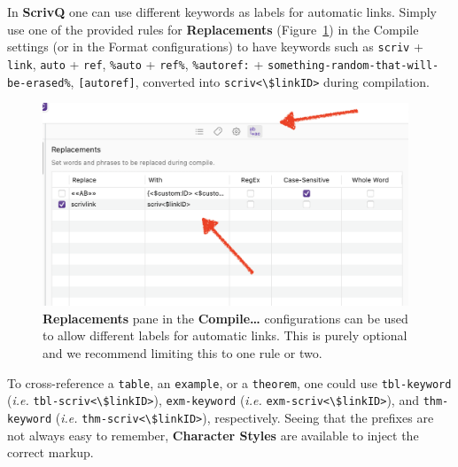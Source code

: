 \documentclass[
  12pt,
  a4paper,
  oneside,
  titlepage,
  toclink=all,
  toc=bibliography]{scrbook}
\theoremstyle{definition}
\theoremstyle{plain}
\theoremstyle{plain}
\theoremstyle{plain}
\theoremstyle{plain}
\theoremstyle{definition}
\theoremstyle{definition}
\theoremstyle{plain}
\theoremstyle{remark}
\begin{document}
\begin{tcolorbox}[enhanced jigsaw, left=2mm, colframe=quarto-callout-tip-color-frame, bottomtitle=1mm, colback=white, coltitle=black, title=\textcolor{quarto-callout-tip-color}{\faLightbulb}\hspace{0.5em}{Choosing your own label for automatic links}, toprule=.15mm, rightrule=.15mm, opacityback=0, breakable, toptitle=1mm, titlerule=0mm, colbacktitle=quarto-callout-tip-color!10!white, arc=.35mm, bottomrule=.15mm, leftrule=.75mm, opacitybacktitle=0.6]

In \textbf{ScrivQ} one can use different keywords as labels for
automatic links. Simply use one of the provided rules for
\textbf{Replacements}
(\protect\hypertarget{cite_6}{}{\label{cite_6}Figure~\ref{fig-scriv3}})
in the Compile settings (or in the Format configurations) to have
keywords such as \texttt{scriv} + \texttt{link}, \texttt{autο} +
\texttt{ref}, \texttt{\%autο} + \texttt{ref\%}, \texttt{\%autοref:} +
\texttt{something-random-that-will-be-erased\%}, \texttt{{[}autοref{]}},
converted into
\texttt{scriv\textless{}\textbackslash{}\$linkID\textgreater{}} during
compilation.

\end{tcolorbox}

\begin{figure}

{\centering \includegraphics[width=4.30208in,height=2.38542in]{Replacements.png}

}

\caption{\label{fig-scriv3}\textbf{Replacements} pane in the
\textbf{Compile\ldots{}} configurations can be used to allow different
labels for automatic links. This is purely optional and we recommend
limiting this to one rule or two.}

\end{figure}

{}To cross-reference a \texttt{table}, an
\texttt{example}, or a \texttt{theorem}, one could use
\texttt{tbl-keyword} (\emph{i.e.}
\texttt{tbl-scriv\textless{}\textbackslash{}\$linkID\textgreater{}}),
\texttt{exm-keyword} (\emph{i.e.}
\texttt{exm-scriv\textless{}\textbackslash{}\$linkID\textgreater{}}),
and \texttt{thm-keyword} (\emph{i.e.}
\texttt{thm-scriv\textless{}\textbackslash{}\$linkID\textgreater{}}),
respectively. Seeing that the prefixes are not always easy to remember,
\textbf{Character Styles} are available to inject the correct markup.
\end{document}
